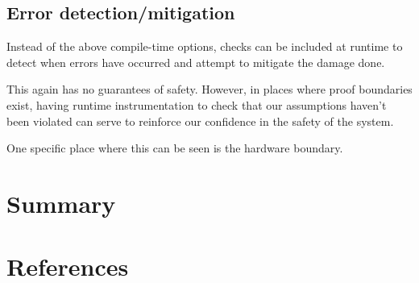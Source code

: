 \documentclass[12pt]{article}
\begin{document}
    
\subsection{Error detection/mitigation}
Instead of the above compile-time options, checks can be included at runtime to detect when errors have occurred and attempt to mitigate the damage done. 

This again has no guarantees of safety. However, in places where proof boundaries exist, having runtime instrumentation to check that our assumptions haven't been violated can serve to reinforce our confidence in the safety of the system.

One specific place where this can be seen is the hardware boundary. %

\section{Summary}

\section{References}
\end{document}
